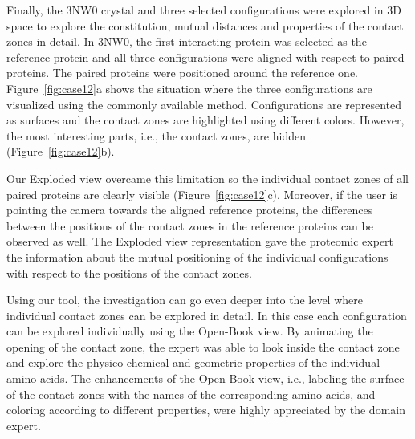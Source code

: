 \documentclass{bmcart}
\def\OpBook {Open-Book view\xspace}
\def\ExpView {Exploded view\xspace}
\begin{document}

Finally, the 3NW0 crystal and three selected configurations were explored in 3D space to explore the constitution, mutual distances and properties of the contact zones in detail.
In 3NW0, the first interacting protein was selected as the reference protein and all three configurations were aligned with respect to paired proteins.
The paired proteins were positioned around the reference one.
Figure~\ref{fig:case12}a shows the situation where the three configurations are visualized using the commonly available method.
Configurations are represented as surfaces and the contact zones are highlighted using different colors.
However, the most interesting parts, i.e., the contact zones, are hidden (Figure~\ref{fig:case12}b).

Our \ExpView overcame this limitation so the individual contact zones of all paired proteins are clearly visible (Figure~\ref{fig:case12}c).
Moreover, if the user is pointing the camera towards the aligned reference proteins, the differences between the positions of the contact zones in the reference proteins can be observed as well.
The \ExpView representation gave the proteomic expert the information about the mutual positioning of the individual configurations with respect to the positions of the contact zones.

Using our tool, the investigation can go even deeper into the level where individual contact zones can be explored in detail.
In this case each configuration can be explored individually using the \OpBook.
By animating the opening of the contact zone, the expert was able to look inside the contact zone and explore the physico-chemical and geometric properties of the individual amino acids.
The enhancements of the \OpBook, i.e., labeling the surface of the contact zones with the names of the corresponding amino acids, and coloring according to different properties, were highly appreciated by the domain expert.
\end{document}
